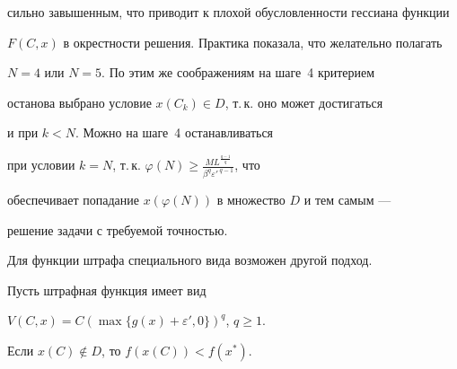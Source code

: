 сильно завышенным, что приводит к плохой обусловленности гессиана функции


$F(C,x)$ в окрестности решения. Практика показала, что желательно полагать


$N=4$ или $N=5$. По этим же соображениям на шаге~4 критерием


останова выбрано условие $x(C_k)\in D$, т.\,к. оно может достигаться 


и при $k<N$. Можно на шаге~4 останавливаться 


при условии $k=N$, т.\,к. $\varphi(N)


\geq \frac{M L^{\frac{q-1}{q}}} {\beta^q {\varepsilon'\,}^{q-1} }$, что


обеспечивает попадание $x(\varphi(N))$ в множество $D$ и тем самым ---


решение задачи с требуемой точностью. 





Для функции штрафа специального вида возможен другой подход. 





\begin{lem}\label{not}


Пусть штрафная функция имеет вид


$V(C,x)=C(\max\{g(x)+\varepsilon',0\})^q$, $q\geq 1$.


Если $x(C)\notin D$, то $f(x(C))<f(x^*)$.


\end{lem}





